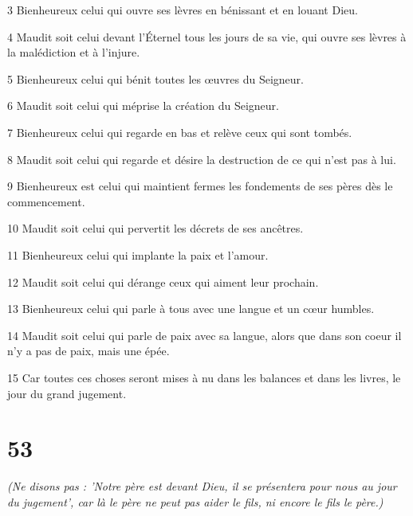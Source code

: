 \par 3 Bienheureux celui qui ouvre ses lèvres en bénissant et en louant Dieu.

\par 4 Maudit soit celui devant l'Éternel tous les jours de sa vie, qui ouvre ses lèvres à la malédiction et à l'injure.

\par 5 Bienheureux celui qui bénit toutes les œuvres du Seigneur.

\par 6 Maudit soit celui qui méprise la création du Seigneur.

\par 7 Bienheureux celui qui regarde en bas et relève ceux qui sont tombés.

\par 8 Maudit soit celui qui regarde et désire la destruction de ce qui n'est pas à lui.

\par 9 Bienheureux est celui qui maintient fermes les fondements de ses pères dès le commencement.

\par 10 Maudit soit celui qui pervertit les décrets de ses ancêtres.

\par 11 Bienheureux celui qui implante la paix et l'amour.

\par 12 Maudit soit celui qui dérange ceux qui aiment leur prochain.

\par 13 Bienheureux celui qui parle à tous avec une langue et un cœur humbles.

\par 14 Maudit soit celui qui parle de paix avec sa langue, alors que dans son coeur il n'y a pas de paix, mais une épée.

\par 15 Car toutes ces choses seront mises à nu dans les balances et dans les livres, le jour du grand jugement.

\chapter{53}

\par \textit{(Ne disons pas : 'Notre père est devant Dieu, il se présentera pour nous au jour du jugement', car là le père ne peut pas aider le fils, ni encore le fils le père.)}

